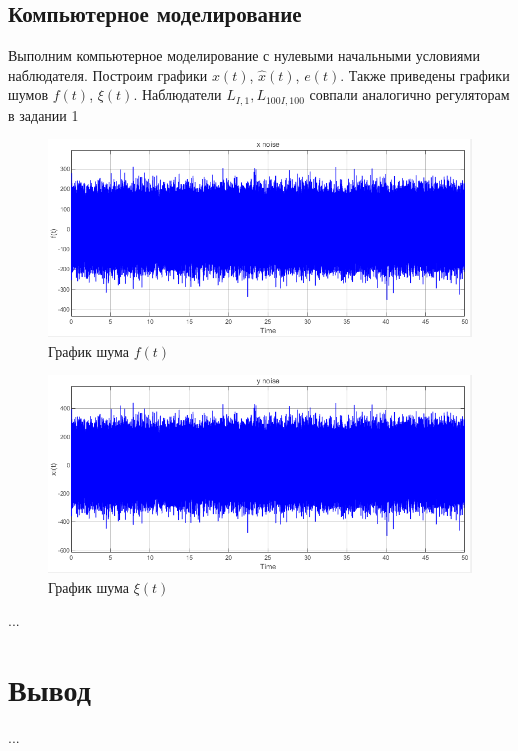 \documentclass[a4paper, 12pt]{article}
\begin{document}
    \subsection{Компьютерное моделирование}
    Выполним компьютерное моделирование с нулевыми начальными условиями наблюдателя.
    Построим графики $x(t)$, $\hat{x}(t)$, $e(t)$.
    Также приведены графики шумов $f(t)$, $\xi(t)$. Наблюдатели $L_{I,1},L_{100I,100}$ совпали аналогично регуляторам в задании 1
    \begin{figure}[H]
        \centering
        \includegraphics[scale=0.75]{2task_x_noise.png}
        \captionsetup{skip=0pt}
        \caption{График шума $f(t)$}
        \label{fig:2task_x_noise}
    \end{figure}
    \begin{figure}[H]
        \centering
        \includegraphics[scale=0.75]{2task_y_noise.png}
        \captionsetup{skip=0pt}
        \caption{График шума $\xi(t)$}
        \label{fig:2task_y_noise}
    \end{figure}


    ...


    \section{Вывод}
    ...
\end{document}

